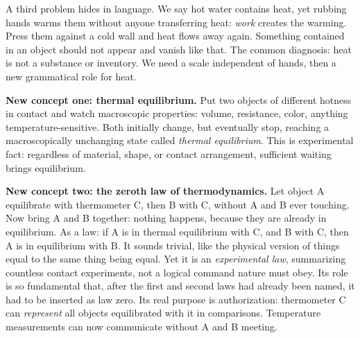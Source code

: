 A third problem hides in language. We say hot water contains heat, yet rubbing hands warms them without anyone transferring heat: \emph{work} creates the warming. Press them against a cold wall and heat flows away again. Something contained in an object should not appear and vanish like that. The common diagnosis: heat is not a substance or inventory. We need a scale independent of hands, then a new grammatical role for heat.


\begin{mainline}
\textbf{New concept one: thermal equilibrium.} Put two objects of different hotness in contact and watch macroscopic properties: volume, resistance, color, anything temperature-sensitive. Both initially change, but eventually stop, reaching a macroscopically unchanging state called \emph{thermal equilibrium}. This is experimental fact: regardless of material, shape, or contact arrangement, sufficient waiting brings equilibrium.

\textbf{New concept two: the zeroth law of thermodynamics.} Let object A equilibrate with thermometer C, then B with C, without A and B ever touching. Now bring A and B together: nothing happens, because they are already in equilibrium. As a law: if A is in thermal equilibrium with C, and B with C, then A is in equilibrium with B. It sounds trivial, like the physical version of things equal to the same thing being equal. Yet it is an \emph{experimental law}, summarizing countless contact experiments, not a logical command nature must obey. Its role is so fundamental that, after the first and second laws had already been named, it had to be inserted as law zero. Its real purpose is authorization: thermometer C can \emph{represent} all objects equilibrated with it in comparisons. Temperature measurements can now communicate without A and B meeting.
\end{mainline}

\begin{center}
\end{center}

